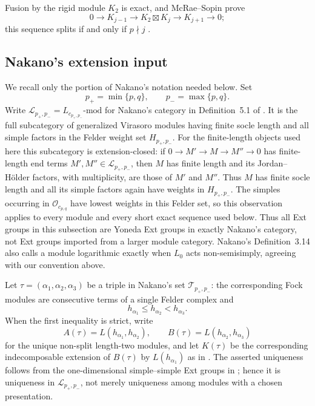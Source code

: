 \documentclass[12pt,leqno]{amsart}
\numberwithin{equation}{section}
\newcommand{\boxt}{\boxtimes}
\newcommand{\Oc}{\mathcal O}
\begin{document}
Fusion by the rigid module $K_2$ is exact, and McRae--Sopin prove
\begin{equation}\label{eq:K2-fusion}
 0\longrightarrow K_{j-1}\longrightarrow K_2\boxt K_j
 \longrightarrow K_{j+1}\longrightarrow0;
\end{equation}
this sequence splits if and only if $p\nmid j$
\cite[Theorem~6.5]{McRaeSopin}.

\subsection{Nakano's extension input}

We recall only the portion of Nakano's notation needed below.  Set
\[
 p_+=\min\{p,q\},\qquad p_-=\max\{p,q\}.
\]
Write $\mathscr L_{p_+,p_-}=L_{c_{p_+,p_-}}\text{-mod}$ for Nakano's
category in Definition~5.1 of \cite{Nakano}.  It is the full subcategory of
generalized Virasoro modules having finite socle length and all simple
factors in the Felder weight set $H_{p_+,p_-}$.  For the finite-length
objects used here this subcategory is extension-closed: if
$0\to M'\to M\to M''\to0$ has finite-length end terms
$M',M''\in\mathscr L_{p_+,p_-}$, then $M$ has finite length and its
Jordan--H\"older factors, with multiplicity, are those of $M'$ and $M''$.
Thus $M$ has finite socle length and all its simple factors again have
weights in $H_{p_+,p_-}$.
The simples occurring in $\Oc_{c_{p,q}}$ have lowest weights in this Felder
set, so this observation applies to every module and every short exact
sequence used below.  Thus all Ext groups in this subsection are Yoneda Ext
groups in exactly Nakano's category, not Ext groups imported from a larger
module category.  Nakano's Definition~3.14 also calls a module
logarithmic exactly when $L_0$ acts non-semisimply, agreeing with our
convention above.

Let $\tau=(\alpha_1,\alpha_2,\alpha_3)$ be a triple in Nakano's set
$\mathcal T_{p_+,p_-}$: the corresponding Fock modules are consecutive terms of a
single Felder complex and
\[
 h_{\alpha_1}\leq h_{\alpha_2}<h_{\alpha_3}.
\]
When the first inequality is strict, write
\[
 A(\tau)=L(h_{\alpha_1},h_{\alpha_2}),
 \qquad B(\tau)=L(h_{\alpha_2},h_{\alpha_3})
\]
for the unique non-split length-two modules, and let $K(\tau)$ be the
corresponding indecomposable extension of $B(\tau)$ by
$L(h_{\alpha_1})$ as in \cite[Definitions~5.9--5.10]{Nakano}.
The asserted uniqueness follows from the one-dimensional simple--simple
Ext groups in \cite[Proposition~5.5]{Nakano}; hence it is uniqueness in
$\mathscr L_{p_+,p_-}$, not merely uniqueness among modules with a chosen
presentation.
\end{document}
